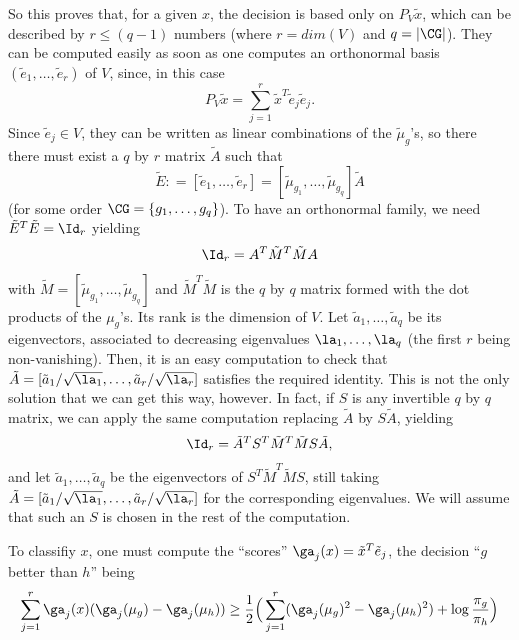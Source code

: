 So this proves that, for a given $x$, the decision is based only on
$P_V\tilde x$, which can be described by $r \leq (q-1)$ numbers (where
$r = \mathit{dim}(V)$ and $q = |\CG|$). They can be computed
easily as soon as one computes an orthonormal basis $(\tilde e_1,
\ldots, \tilde e_{r})$ of $V$, since, in
this case
$$
P_V \tilde x = \sum_{j=1}^{r} \tilde x^T\tilde e_j \tilde e_j.
$$
Since $\tilde e_j \in V$, they can be written as linear combinations
of the $\tilde\mu_g$'s, so there there must exist a $q$ by $r$
matrix $\tilde A$ such that
$$
\tilde E: = [\tilde e_1, \ldots, \tilde e_{r}] = [\tilde \mu_{g_1}, \ldots, \tilde
\mu_{g_q}] \tilde A
$$
(for some order $\CG = \{g_1, \ldots, g_q\}$). To have an orthonormal
family, we need $\tilde E^T\tilde E = \Id_{r}$ yielding
$$
\Id_{r} = A^T  \tilde M^T \tilde M A
$$
with $\tilde M = [\tilde \mu_{g_1}, \ldots, \tilde
\mu_{g_q}]$ and $\tilde M^T\tilde M$ is the $q$ by $q$ matrix formed
with the dot products of the $\mu_g$'s. Its rank is the dimension of
$V$. Let $\tilde a_1, \ldots, \tilde a_q$ be its eigenvectors,
associated to decreasing eigenvalues $\la_1, \ldots, \la_q$ (the first
$r$ being non-vanishing). Then, it is an easy computation to check
that 
$\tilde A = [\tilde a_1/\sqrt{\la_1},
\ldots, \tilde a_{r}/\sqrt{\la_r}]$ satisfies the required
identity. This is not the only solution that we can get this way,
however. In fact, if $S$ is any invertible $q$ by $q$
matrix, we can apply the same computation replacing $\tilde A$ by
$S\tilde A$,
yielding
$$
\Id_{r} = \tilde A^T S^T  \tilde M^T \tilde M S \tilde A,
$$
and let $\tilde a_1, \ldots, \tilde a_q$ be the eigenvectors of
$S^T \tilde M^T \tilde M S$, still taking 
$\tilde A = [\tilde a_1/\sqrt{\la_1},
\ldots, \tilde a_{r}/\sqrt{\la_r}]$ for the corresponding eigenvalues. We will assume that such an $S$ is
chosen in the rest of the computation.

To classifiy $x$, one must compute the ``scores'' $\ga_j(x) =
\tilde x^T \tilde e_j$, the decision ``$g$ better than $h$'' being 
$$
\sum_{j=1}^r\ga_j(x)(\ga_j(\mu_g) - \ga_j(\mu_h)) \geq \frac{1}{2}
\Big(\sum_{j=1}^r (\ga_j(\mu_g)^2 - \ga_j(\mu_h)^2) + \log \frac{\pi_g}{\pi_h}\Big)
$$


